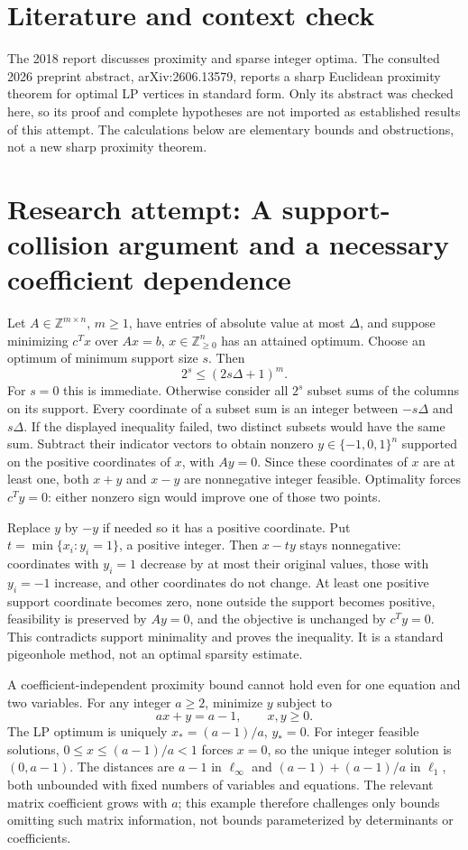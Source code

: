 \documentclass[11pt]{article}
\begin{document}
\section{Literature and context check}
The 2018 report discusses proximity and sparse integer optima. The consulted 2026 preprint abstract, arXiv:2606.13579, reports a sharp Euclidean proximity theorem for optimal LP vertices in standard form. Only its abstract was checked here, so its proof and complete hypotheses are not imported as established results of this attempt. The calculations below are elementary bounds and obstructions, not a new sharp proximity theorem.
\section{Research attempt: A support-collision argument and a necessary coefficient dependence}
Let $A\in\mathbb Z^{m\times n}$, $m\ge1$, have entries of absolute value at most $\Delta$, and suppose minimizing $c^Tx$ over $Ax=b$, $x\in\mathbb Z_{\ge0}^n$ has an attained optimum. Choose an optimum of minimum support size $s$. Then
\[
2^s\le(2s\Delta+1)^m.
\]
For $s=0$ this is immediate. Otherwise consider all $2^s$ subset sums of the columns on its support. Every coordinate of a subset sum is an integer between $-s\Delta$ and $s\Delta$. If the displayed inequality failed, two distinct subsets would have the same sum. Subtract their indicator vectors to obtain nonzero $y\in\{-1,0,1\}^n$ supported on the positive coordinates of $x$, with $Ay=0$. Since these coordinates of $x$ are at least one, both $x+y$ and $x-y$ are nonnegative integer feasible. Optimality forces $c^Ty=0$: either nonzero sign would improve one of those two points.

Replace $y$ by $-y$ if needed so it has a positive coordinate. Put $t=\min\{x_i:y_i=1\}$, a positive integer. Then $x-ty$ stays nonnegative: coordinates with $y_i=1$ decrease by at most their original values, those with $y_i=-1$ increase, and other coordinates do not change. At least one positive support coordinate becomes zero, none outside the support becomes positive, feasibility is preserved by $Ay=0$, and the objective is unchanged by $c^Ty=0$. This contradicts support minimality and proves the inequality. It is a standard pigeonhole method, not an optimal sparsity estimate.

A coefficient-independent proximity bound cannot hold even for one equation and two variables. For any integer $a\ge2$, minimize $y$ subject to
\[
ax+y=a-1,\qquad x,y\ge0.
\]
The LP optimum is uniquely $x_*=(a-1)/a$, $y_*=0$. For integer feasible solutions, $0\le x\le(a-1)/a<1$ forces $x=0$, so the unique integer solution is $(0,a-1)$. The distances are $a-1$ in $\ell_\infty$ and $(a-1)+(a-1)/a$ in $\ell_1$, both unbounded with fixed numbers of variables and equations. The relevant matrix coefficient grows with $a$; this example therefore challenges only bounds omitting such matrix information, not bounds parameterized by determinants or coefficients.
\end{document}
